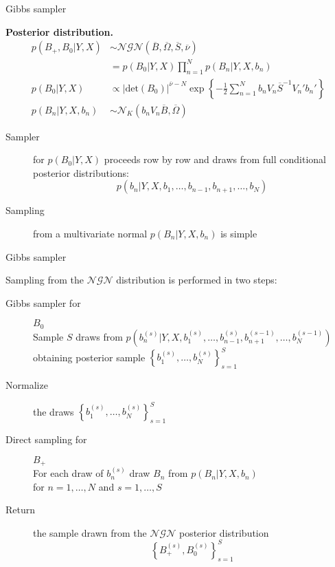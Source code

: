 \documentclass[notes,blackandwhite,mathsans,usenames,dvipsnames]{beamer}
\begin{document}
\begin{frame}{Gibbs sampler}

\textbf{Posterior distribution.}
\begin{align*}
p(B_+,B_0|Y,X)&\sim\mathcal{NGN}\left( \overline{B}, \overline{\Omega}, \overline{S} , \overline{\nu}  \right)\\[2ex]
&= p(B_0|Y,X)\prod_{n=1}^{N}p(B_n|Y,X,b_n)\\
p(B_0|Y,X)&\propto |\text{det}(B_0)|^{\overline{\nu}-N}\exp\left\{ -\frac{1}{2}\sum_{n=1}^N b_nV_n\overline{S}^{-1}V_n'b_n'\right\}\\
p(B_n|Y,X,b_n)&\sim\mathcal{N}_K\left( b_nV_n\overline{B}, \overline{\Omega} \right)
\end{align*}

\begin{description}
\item[Sampler] {\color{mcxs2}for} $p(B_0|Y,X)$ {\color{mcxs2}proceeds row by row and draws from full conditional posterior distributions:}
$$p\left(b_n|Y,X,b_1,\dots,b_{n-1},b_{n+1},\dots,b_N\right)$$
\item[Sampling] {\color{mcxs2}from a multivariate normal} $p(B_n|Y,X,b_n)$ {\color{mcxs2}is simple}
\end{description}


\end{frame}




\begin{frame}{Gibbs sampler}

{\color{mcxs2}Sampling from the} $\mathcal{NGN}$ {\color{mcxs2}distribution is performed in} {\color{purple}two steps:}

\bigskip
\begin{description}
\item[Gibbs sampler for] $B_0$ \\ {\color{mcxs2}Sample} $S$ {\color{mcxs2}draws from}
$p\left(b_n^{(s)}|Y,X,b_1^{(s)},\dots,b_{n-1}^{(s)},b_{n+1}^{(s-1)},\dots,b_N^{(s-1)}\right)$
{\color{mcxs2}obtaining posterior sample} $\left\{ b_1^{(s)}, \dots, b_N^{(s)} \right\}_{s=1}^S$

\bigskip\item[\color{purple}Normalize] {\color{mcxs2}the draws} $\left\{ b_1^{(s)}, \dots, b_N^{(s)} \right\}_{s=1}^S$

\bigskip\item[Direct sampling for] $B_+$ \\
{\color{mcxs2}For each draw of} $b_n^{(s)}$ {\color{mcxs2}draw} $B_n$ {\color{mcxs2}from} $p(B_n|Y,X,b_n)$\\ {\color{mcxs2}for} $n=1,\dots,N$ {\color{mcxs2}and} $s=1,\dots,S$

\bigskip\item[Return] {\color{mcxs2}the sample drawn from the $\mathcal{NGN}$ posterior distribution}
$$ \left\{ B_+^{(s)}, B_0^{(s)} \right\}_{s=1}^{S} $$
\end{description}
\end{frame}
\end{document}
